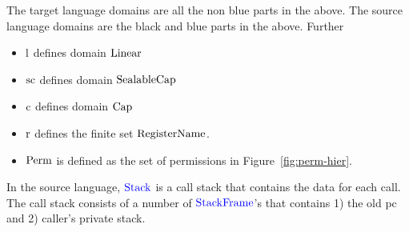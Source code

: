 \documentclass[a4paper]{article}
\begin{document}
The target language domains are all the non blue parts in the above. The source language domains are the black and blue parts in the above. Further
\begin{itemize}
\item $\mathrm{l}$ defines domain $\mathrm{Linear}$
\item $\mathrm{sc}$ defines domain $\mathrm{SealableCap}$
\item $\mathrm{c}$ defines domain $\mathrm{Cap}$
\item $\mathrm{r}$ defines the finite set $\mathrm{RegisterName}$. 
\item $\mathrm{Perm}$ is defined as the set of permissions in Figure~\ref{fig:perm-hier}.
\end{itemize}

In the source language, ${\color{blue} \mathrm{Stack}}$ is a call stack that contains the data for each call. The call stack consists of a number of ${\color{blue} \mathrm{StackFrame}}$'s that contains 1) the old pc and 2) caller's private stack.
\end{document}
